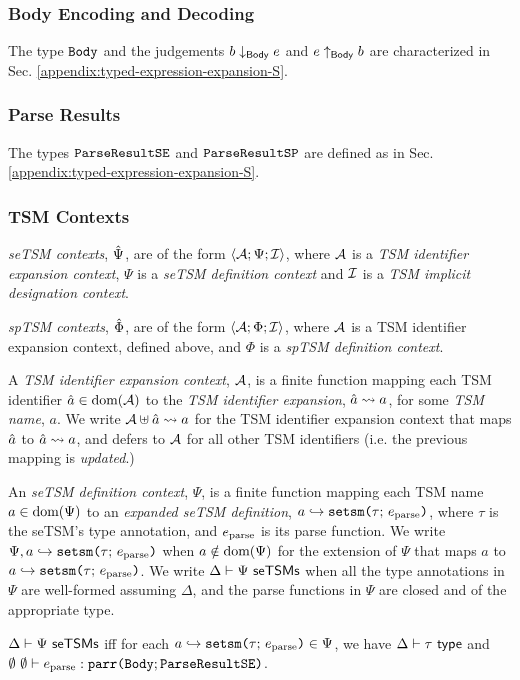 \subsubsection{Body Encoding and Decoding}
The type $\mathtt{Body}$ and the judgements $b \downarrow_\mathsf{Body} e$ and $e \uparrow_\mathsf{Body} b$ are characterized in Sec. \ref{appendix:typed-expression-expansion-S}.

\subsubsection{Parse Results}
The types $\mathtt{ParseResultSE}$ and $\mathtt{ParseResultSP}$ are defined as in Sec. \ref{appendix:typed-expression-expansion-S}.

\subsubsection{TSM Contexts}

\emph{seTSM contexts}, $\hat{\Psi}$, are of the form $\langle \mathcal{A}; \Psi; \mathcal{I} \rangle$, where $\mathcal{A}$ is a \emph{TSM identifier expansion context}, $\Psi$ is a \emph{seTSM definition context} and $\mathcal{I}$ is a \emph{TSM implicit designation context}.

\emph{spTSM contexts}, $\hat\Phi$, are of the form $\langle \mathcal{A}; \Phi; \mathcal{I} \rangle$, where $\mathcal{A}$ is a {TSM identifier expansion context}, defined above, and $\Phi$ is a \emph{spTSM definition context}. 

A \emph{TSM identifier expansion context}, $\mathcal{A}$, is a finite function mapping each TSM identifier $\hat{a} \in \text{dom}(\mathcal{A})$ to the \emph{TSM identifier expansion}, $\hat{a} \leadsto a$, for some \emph{TSM name}, $a$. We write $\mathcal{A} \uplus \hat{a} \leadsto a$ for the TSM identifier expansion context that maps $\hat{a}$ to $\hat{a} \leadsto a$, and defers to $\mathcal{A}$ for all other TSM identifiers (i.e. the previous mapping is \emph{updated}.)

An \emph{seTSM definition context}, $\Psi$, is a finite function mapping each TSM name $a \in \text{dom}(\Psi)$ to an \emph{expanded seTSM definition}, $a \hookrightarrow \texttt{setsm}\texttt{(}\tau;\,e_\text{parse}\texttt{)}$, where $\tau$ is the seTSM's type annotation, and $e_\text{parse}$ is its parse function. We write $\Psi, a \hookrightarrow \texttt{setsm}\texttt{(}\tau;\,e_\text{parse}\texttt{)}$ when $a \notin \text{dom}(\Psi)$ for the extension of $\Psi$ that maps $a$ to $a \hookrightarrow \texttt{setsm}\texttt{(}\tau;\,e_\text{parse}\texttt{)}$. We write $\Delta \vdash \Psi~\mathsf{seTSMs}$  when all the type annotations in $\Psi$ are well-formed assuming $\Delta$, and the parse functions in $\Psi$ are closed and of the appropriate type.

\begin{definition}\label{def:seTSM-def-ctx-formation-B} $\Delta \vdash \Psi~\mathsf{seTSMs}$ iff for each $a \hookrightarrow \texttt{setsm}\texttt{(}\tau;\,e_\text{parse}\texttt{)} \in \Psi$, we have $\Delta \vdash \tau~\mathsf{type}$ and $\emptyset~\emptyset \vdash e_\text{parse} : \texttt{parr}\texttt{(}\mathtt{Body}; \mathtt{ParseResultSE}\texttt{)}$.\end{definition}

